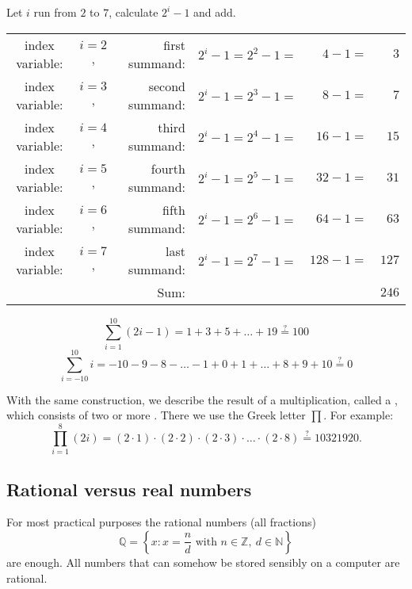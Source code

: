 \begin{Faust}{Let $i$ run from $2$ to $7${,} calculate $2^i-1$
and add.}
\begin{tabular}{ccrrrr}
index variable: & $i=2$, & first summand: & $2^i-1=2^2-1=$&$4-1=$&$3$\\
index variable: & $i=3$, & second summand: & $2^i-1=2^3-1=$&$8-1=$&$7$\\
index variable: & $i=4$, & third summand: & $2^i-1=2^4-1=$&$16-1=$&$15$\\
index variable: & $i=5$, & fourth summand: & $2^i-1=2^5-1=$&$32-1=$&$31$\\
index variable: & $i=6$, & fifth summand: & $2^i-1=2^6-1=$&$64-1=$&$63$\\
index variable: & $i=7$, & last summand: & $2^i-1=2^7-1=$&\!\!$128-1=$&$127$\\
\hline
 & & Sum: & & &$246$
\end{tabular}
\end{Faust}


\begin{example}{}
\[
\sum\limits_{i=1}^{10} (2i-1) = 1+3+5+\ldots+19 \stackrel?= 100
\]
\[
\sum\limits_{i=-10}^{10} i = -10-9-8-\ldots-1+0+1+\dots+8+9+10 \stackrel?=0
\]
\end{example}

With the same construction,
we describe the result of a multiplication, called a , which consists of two or
more . There we use the Greek letter $\prod$. 
For example:
\[
\prod_{i=1}^8 (2i) = (2\cdot 1)\cdot (2\cdot 2)\cdot (2\cdot 3)\cdot \ldots \cdot (2\cdot 8) 
\stackrel?= 10321920.
\]


\pbpres



\subsection*{Rational versus real numbers}


For most practical purposes the rational numbers (all fractions)
\[
 \mathbb{Q} = \left\{ x : x = \frac{n}{d} \text{ with }  n \in \mathbb{Z}, ~ d \in \mathbb{N} \right\}
\]
are enough. All numbers that can somehow be stored sensibly on a computer are rational. 


